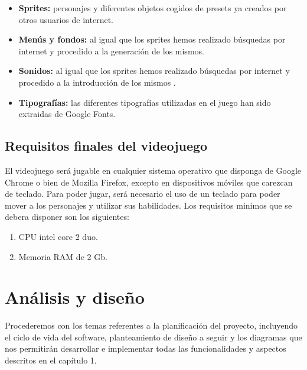 \documentclass[palatino]{apuntes}
\begin{document}
\begin{itemize}
    \item \textbf{Sprites:} personajes y diferentes objetos  cogidos de presets ya creados por otros usuarios de internet.
    \item \textbf{Menús y fondos:} al igual que los sprites hemos realizado búsquedas por internet y procedido a la generación de los mismos.
    \item \textbf{Sonidos:} al igual que los sprites hemos realizado búsquedas por internet y procedido a la introducción de los mismos .
    \item \textbf{Tipografías:} las diferentes tipografías utilizadas en el juego han sido extraidas de Google Fonts.
\end{itemize}


\section{Requisitos finales del videojuego}
El videojuego será jugable en cualquier sistema operativo que disponga de Google Chrome o bien de Mozilla Firefox, excepto en dispositivos móviles que carezcan de teclado.
Para poder jugar, será necesario el uso de un teclado para poder mover a los personajes y utilizar sus habilidades.
Los requisitos minimos que se debera disponer son los siguientes:

\begin{enumerate}
    \item CPU intel core 2 duo.
    \item Memoria RAM de 2 Gb.
\end{enumerate}
    
    
    
    
    
    
    
    
    
    
    
    
    
    
    
    
    

\chapter{Análisis y diseño}
Procederemos con los temas referentes a la planificación del proyecto, incluyendo el ciclo de vida del software, planteamiento de diseño a seguir y los diagramas que nos permitirán desarrollar e implementar todas las funcionalidades y aspectos descritos en el capítulo 1.
\end{document}
